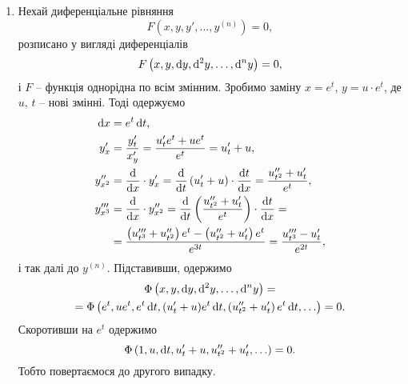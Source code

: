 \begin{enumerate}
\item Нехай диференціальне рівняння
\begin{equation*}
	F \left( x, y, y', \ldots, y^{(n)} \right) = 0,
\end{equation*}
розписано у вигляді диференціалів
\begin{equation*}
	F \left( x, y, \mathop{}\!\mathrm{d} y, \mathop{}\!\mathrm{d}^2 y , \ldots, \mathop{}\!\mathrm{d}^n y \right) = 0,
\end{equation*}
і $F$ -- функція однорідна по всім змінним. Зробимо заміну $x = e^t$, $y = u \cdot e^t$, де $u$, $t$ -- нові змінні. Тоді одержуємо
\begin{align}
	\diff x &= e^t \diff t, \\
	y_x^\prime &=  \frac{y_t^\prime}{x_y^\prime} = \frac{u_t^\prime e^t + u e^t}{e^t} = u_t^\prime + u, \\
	y_{x^2}^{\prime\prime} &= \frac{\diff}{\diff x} \cdot y_x^\prime = \frac{\diff}{\diff t} \left( u_t^\prime + u \right) \cdot \frac{\diff t}{\diff x} = \frac{u_{t^2}^{\prime\prime} + u_t^\prime}{e^t}, \\
	y_{x^3}^{\prime\prime\prime} &= \frac{\diff}{\diff x} \cdot y_{x^2}^{\prime\prime} = \frac{\diff}{\diff t} \left( \frac{u_{t^2}^{\prime\prime} + u_t^\prime }{e^t} \right) \cdot \frac{\diff t}{\diff x} = \\
	&= \frac{\left( u_{t^3}^{\prime\prime\prime} + u_{t^2}^{\prime\prime} \right) e^t - \left( u_{t^2}^{\prime\prime} + u_t^\prime \right) e^t}{e^{3t}} = \frac{u_{t^3}^{\prime\prime\prime} - u_t^\prime}{e^{2t}}, \nonumber
\end{align}
і так далі до $y^{(n)}$. Підставивши, одержимо
\begin{multline}
	\Phi \left(x, y, \mathop{}\!\mathrm{d} y, \mathop{}\!\mathrm{d}^2 y, \ldots, \mathop{}\!\mathrm{d}^n y\right) = \\
	= \Phi\left( e^t, u e^t, e^t \mathop{}\!\mathrm{d} t, (u_t^\prime + u)e^t \mathop{}\!\mathrm{d} t, \left(u_{t^2}^{\prime\prime} + u_t^\prime\right) e^t \mathop{}\!\mathrm{d} t, \ldots\right) = 0.
\end{multline} 
Скоротивши на $e^t$ одержимо
\begin{equation*}
	\Phi\left( 1, u, \mathop{}\!\mathrm{d} t, u_t^\prime + u, u_{t^2}^{\prime\prime} + u_t^\prime, \ldots\right) = 0.
\end{equation*} 
Тобто повертаємося до другого випадку.
\end{enumerate}